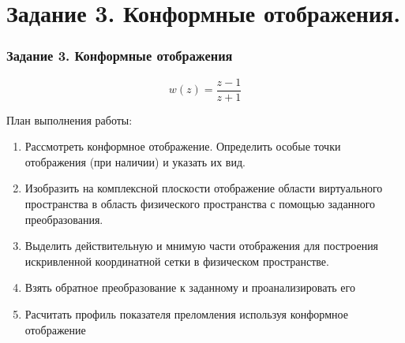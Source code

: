 \section{Задание 3. Конформные отображения.}
\begin{frame}\frametitle{Задание 3. Конформные отображения}
\begin{equation*}
  w(z) = \frac{z-1}{z+1}
\end{equation*}

План выполнения работы:
\begin{enumerate}
  \item Рассмотреть конформное отображение. 
  Определить особые точки отображения (при наличии) и указать их вид.

  \item Изобразить на комплексной плоскости отображение
  области виртуального пространства в область физического пространства
  с помощью заданного преобразования. 

  \item Выделить действительную и мнимую части отображения
  для построения искривленной координатной сетки в физическом пространстве.

  \item Взять обратное преобразование к заданному и проанализировать его
  
  \item Расчитать профиль показателя преломления используя конформное отображение

\end{enumerate}
\end{frame}
